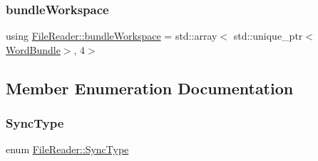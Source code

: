 \mbox{\label{class_file_reader_a7fb625dc45cee3256d37cc19c65cad86}} 
\subsubsection{\texorpdfstring{bundle\+Workspace}{bundleWorkspace}}
{\footnotesize\ttfamily using \hyperlink{class_file_reader_a7fb625dc45cee3256d37cc19c65cad86}{File\+Reader\+::bundle\+Workspace} =  std\+::array$<$ std\+::unique\+\_\+ptr$<$\hyperlink{class_word_bundle}{Word\+Bundle}$>$, 4$>$\hspace{0.3cm}{\ttfamily [private]}}



\subsection{Member Enumeration Documentation}
\mbox{\label{class_file_reader_aa591258dbf3366cfd674e84a1f2f6531}} 
\subsubsection{\texorpdfstring{Sync\+Type}{SyncType}}
{\footnotesize\ttfamily enum \hyperlink{class_file_reader_aa591258dbf3366cfd674e84a1f2f6531}{File\+Reader\+::\+Sync\+Type}\hspace{0.3cm}{\ttfamily [private]}}

